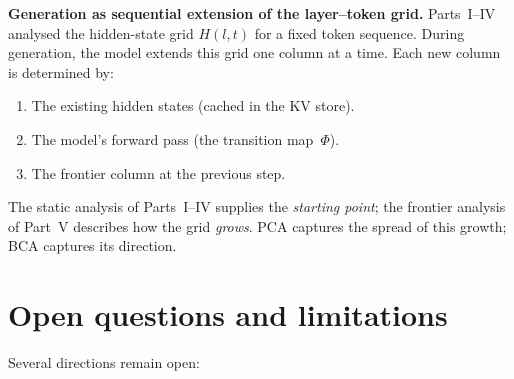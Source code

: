 \documentclass[11pt, twoside, openright]{memoir}
\numberwithin{equation}{chapter}
\begin{document}
\begin{gabox}
\textbf{Generation as sequential extension of the layer--token
grid.}
Parts~I--IV analysed the hidden-state grid $H(l, t)$ for a fixed
token sequence.  During generation, the model extends this grid one
column at a time.  Each new column is determined by:
\begin{enumerate}[nosep]
\item The existing hidden states (cached in the KV store).
\item The model's forward pass (the transition map~$\Phi$).
\item The frontier column at the previous step.
\end{enumerate}

The static analysis of Parts~I--IV supplies the \emph{starting
point}; the frontier analysis of Part~V describes how the grid
\emph{grows}.  PCA captures the spread of this growth; BCA
captures its direction.
\end{gabox}


\section{Open questions and limitations}
\label{sec:pred-open}

Several directions remain open:
\end{document}
